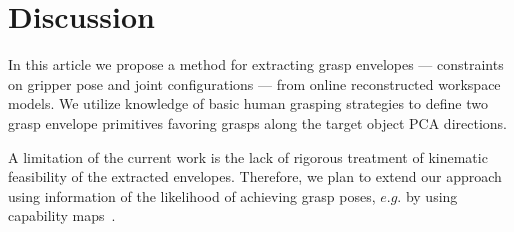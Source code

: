 \section{Discussion}
\label{sec:discussion}
%
In this article we propose a method for extracting grasp envelopes --- constraints on gripper pose and joint configurations --- from online reconstructed workspace models.
We utilize knowledge of basic human grasping strategies to define two grasp envelope primitives favoring grasps along the target object PCA directions. 
\par
A limitation of the current work is the lack of rigorous treatment of kinematic feasibility of the extracted envelopes.
Therefore, we plan to extend our approach using information of the likelihood of achieving grasp poses, $e.g.$ by using capability maps~\cite{Zach07}.